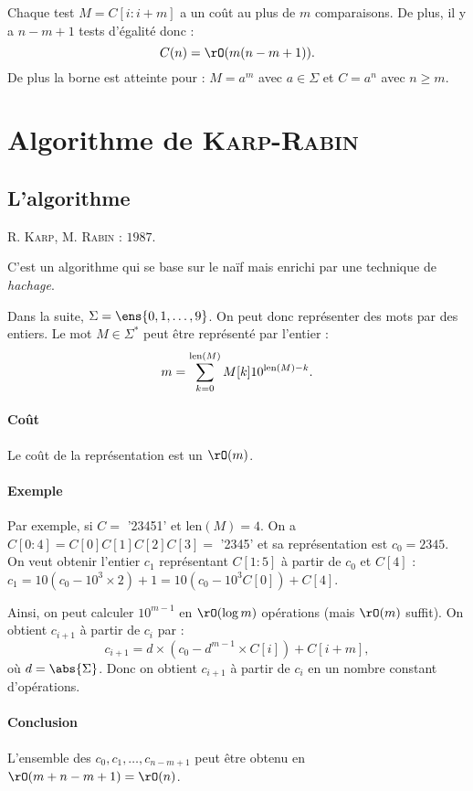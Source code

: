 \documentclass{mybourbaki}
\begin{document}
Chaque test $M = C[i:i+m]$ a un coût au plus de $m$ comparaisons. De plus, il y a $n-m+1$ tests d'égalité donc : \[ C(n) = \rO(m(n-m+1)).\]
De plus la borne est atteinte pour : $M = a^{m}$ avec $a\in \Sigma$ et $C = a^{n}$ avec $n\geq m$.

\section{Algorithme de \textsc{Karp}-\textsc{Rabin}}
\subsection{L'algorithme}
R. \textsc{Karp}, M. \textsc{Rabin} : $1987$.

C'est un algorithme qui se base sur le naïf mais enrichi par une technique de \textit{hachage}.

Dans la suite, $\Sigma = \ens{0,1,\ldots,9}$. On peut donc  représenter des mots par des entiers. Le mot $M \in \Sigma^{*}$ peut être représenté par l'entier : \[ m = \sum_{k=0}^{{\rm len}(M)}M[k]10^{{\rm len}(M) - k}.\]

\paragraph{Coût}Le coût de la représentation est un $\rO(m)$.
\paragraph{Exemple}
Par exemple, si $C =$ '23451' et len$(M)=4$. On a $C[0:4] = C[0]C[1]C[2]C[3] =$ '2345' et sa représentation est $c_0 = 2345$. On veut obtenir l'entier $c_1$ représentant $C[1:5]$ à partir de $c_0$ et $C[4]$ : $c_1 = 10(c_0 - 10^{3}\times 2) +1 = 10(c_0 - 10^{3}C[0]) + C[4]$.

Ainsi, on peut calculer $10^{m-1}$ en $\rO(\log m)$ opérations (mais $\rO(m)$ suffit). On obtient $c_{i+1}$ à partir de $c_i$ par : \[c_{i+1} = d\times(c_0 - d^{m-1}\times C[i]) + C[i+m], \]où $d=\abs{\Sigma}$.
Donc on obtient $c_{i+1}$ à partir de $c_i$ en un nombre constant d'opérations.

\paragraph{Conclusion}L'ensemble des $c_0,c_1,\ldots,c_{n-m+1}$ peut être obtenu en $\rO(m+n-m+1) = \rO(n)$.
\end{document}

